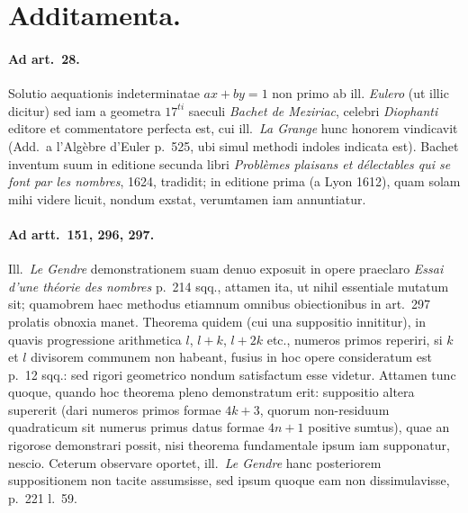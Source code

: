 \documentclass[12pt,a4paper]{article}
\theoremstyle{plain}
\theoremstyle{definition}
\theoremstyle{remark}
\begin{document}
\newpage
\section*{Additamenta.}

\paragraph{Ad art.~28.}
Solutio aequationis indeterminatae $ax + by = 1$ non primo ab ill.
\textit{Eulero} (ut illic dicitur) sed iam a geometra $17^{ti}$ saeculi
\textit{Bachet de Meziriac}, celebri \textit{Diophanti} editore et commentatore
perfecta est, cui ill.\ \textit{La Grange} hunc honorem vindicavit (Add.\ a
l'Alg\`ebre d'Euler p.~525, ubi simul methodi indoles indicata est).
Bachet inventum suum in editione secunda libri \textit{Probl\`emes plaisans
et d\'electables qui se font par les nombres}, 1624, tradidit; in editione
prima (a Lyon 1612), quam solam mihi videre licuit, nondum exstat,
verumtamen iam annuntiatur.

\paragraph{Ad artt.~151, 296, 297.}
Ill.\ \textit{Le Gendre} demonstrationem suam denuo exposuit in opere
praeclaro \textit{Essai d'une th\'eorie des nombres} p.~214 sqq., attamen ita,
ut nihil essentiale mutatum sit; quamobrem haec methodus etiamnum omnibus
obiectionibus in art.~297 prolatis obnoxia manet. Theorema quidem (cui
una suppositio innititur), in quavis progressione arithmetica
$l$, $l+k$, $l+2k$ etc., numeros primos reperiri, si $k$ et $l$
divisorem communem non habeant, fusius in hoc opere consideratum est
p.~12 sqq.: sed rigori geometrico nondum satisfactum esse videtur.
Attamen tunc quoque, quando hoc theorema pleno demonstratum erit:
suppositio altera supererit (dari numeros primos formae $4k+3$, quorum
non-residuum quadraticum sit numerus primus datus formae $4n+1$
positive sumtus), quae an rigorose demonstrari possit, nisi theorema
fundamentale ipsum iam supponatur, nescio. Ceterum observare oportet,
ill.\ \textit{Le Gendre} hanc posteriorem suppositionem non tacite
assumsisse, sed ipsum quoque eam non dissimulavisse, p.~221 l.~59.
\end{document}
